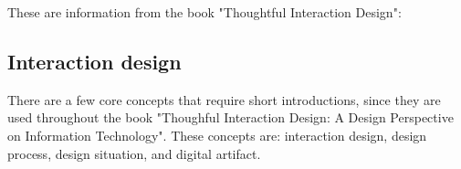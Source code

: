 These are information from the book "Thoughtful Interaction Design":



\subsection{Interaction design}

There are a few core concepts that require short introductions, since they are used throughout the book "Thoughful Interaction Design: A Design Perspective on Information Technology". These concepts are: interaction design, design process, design situation, and digital artifact.

